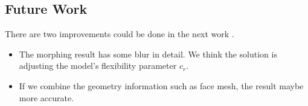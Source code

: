 \documentclass{article} %
\begin{document}
\subsection{Future Work}
        There are two improvements could be done in the next work .\\
        \begin{itemize}
          \item
          The morphing result has some blur in detail. We think the solution is adjusting the model's flexibility parameter $c_{r}$.
          \item
          If we combine the geometry information such as face mesh, the result maybe more accurate.
     
       \end{itemize}
        
        
        
        

\end{document}

